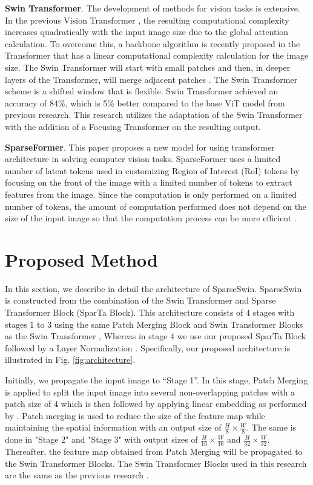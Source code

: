 \documentclass[runningheads]{llncs}
\begin{document}
\textbf{Swin Transformer}. The development of methods for vision tasks is extensive. In the previous Vision Transformer \cite{dosovitskiy2020image}, the resulting computational complexity increases quadratically with the input image size due to the global attention calculation. To overcome this, a backbone algorithm is recently proposed in the Transformer that has a linear computational complexity calculation for the image size. The Swin Transformer will start with small patches and then, in deeper layers of the Transformer, will merge adjacent patches \cite{liu2021swin}. The Swin Transformer scheme is a shifted window that is flexible. Swin Transformer achieved an accuracy of 84\%, which is 5\% better compared to the base ViT model from previous research. This research utilizes the adaptation of the Swin Transformer with the addition of a Focusing Transformer on the resulting output.

\textbf{SparseFormer}. This paper proposes a new model for using transformer architecture in solving computer vision tasks. SparseFormer uses a limited number of latent tokens used in customizing Region of Interest (RoI) tokens by focusing on the front of the image with a limited number of tokens to extract features from the image. Since the computation is only performed on a limited number of tokens, the amount of computation performed does not depend on the size of the input image so that the computation process can be more efficient \cite{gao2023sparseformer}.

\section{Proposed Method}
\label{sec:proposed_method}
In this section, we describe in detail the architecture of SparseSwin. SparseSwin is constructed from the combination of the Swin Transformer and Sparse Transformer Block (SparTa Block). This architecture consists of 4 stages with stages 1 to 3 using the same Patch Merging Block and Swin Transformer Blocks as the Swin Transformer \cite{liu2021swin}, Whereas in stage 4 we use our proposed SparTa Block followed by a Layer Normalization \cite{ba2016layer}. Specifically, our proposed architecture is illustrated in Fig. \ref{fig:architecture}.

Initially, we propagate the input image to “Stage 1”. In this stage, Patch Merging is applied to split the input image into several non-overlapping patches with a patch size of 4 which is then followed by applying linear embedding as performed by \cite{liu2021swin}. Patch merging is used to reduce the size of the feature map while maintaining the spatial information with an output size of $\frac{H}{8}\times\frac{W}{8}$. The same is done in "Stage 2" and "Stage 3" with output sizes of $\frac{H}{16}\times\frac{W}{16}$ and $\frac{H}{32}\times\frac{W}{32}$. Thereafter, the feature map obtained from Patch Merging will be propagated to the Swin Transformer Blocks. The Swin Transformer Blocks used in this research are the same as the previous research \cite{liu2021swin}. 
\end{document}
